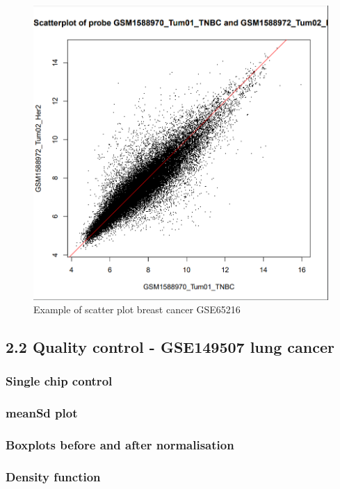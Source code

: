 \documentclass[
]{article}
\begin{document}
\begin{figure}

{\centering \includegraphics[width=0.5\linewidth]{images/breast_scatter_example1} 

}

\caption{Example of scatter plot breast cancer GSE65216}\label{fig:Scatter plot - breast qc}
\end{figure}

\hypertarget{quality-control---gse149507-lung-cancer}{%
\subsection{2.2 Quality control - GSE149507 lung
cancer}\label{quality-control---gse149507-lung-cancer}}

\hypertarget{single-chip-control-1}{%
\subsubsection{Single chip control}\label{single-chip-control-1}}

\hypertarget{meansd-plot-1}{%
\subsubsection{meanSd plot}\label{meansd-plot-1}}

\hypertarget{boxplots-before-and-after-normalisation-1}{%
\subsubsection{Boxplots before and after
normalisation}\label{boxplots-before-and-after-normalisation-1}}

\hypertarget{density-function-1}{%
\subsubsection{Density function}\label{density-function-1}}
\end{document}
